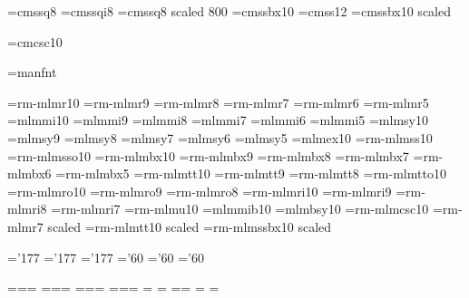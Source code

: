 \font\eightss=cmssq8
\font\eightssi=cmssqi8
\font\sixss=cmssq8 scaled 800
\font\tenssbx=cmssbx10
\font\twelvess=cmss12
\font\titlefont=cmssbx10 scaled

\font\tencsc=cmcsc10

\font\manfnt=manfnt %


\font\tenrm=rm-mlmr10 %
\font\preloaded=rm-mlmr9
\font\preloaded=rm-mlmr8
\font\sevenrm=rm-mlmr7
\font\preloaded=rm-mlmr6
\font\fiverm=rm-mlmr5
\font\teni=mlmmi10 %
\font\preloaded=mlmmi9
\font\preloaded=mlmmi8
\font\seveni=mlmmi7
\font\preloaded=mlmmi6
\font\fivei=mlmmi5
\font\tensy=mlmsy10 %
\font\preloaded=mlmsy9
\font\preloaded=mlmsy8
\font\sevensy=mlmsy7
\font\preloaded=mlmsy6
\font\fivesy=mlmsy5
\font\tenex=mlmex10 %
\font\preloaded=rm-mlmss10 %
\font\preloaded=rm-mlmsso10 %
\font\tenbf=rm-mlmbx10 %
\font\preloaded=rm-mlmbx9
\font\preloaded=rm-mlmbx8
\font\sevenbf=rm-mlmbx7
\font\preloaded=rm-mlmbx6
\font\fivebf=rm-mlmbx5
\font\tentt=rm-mlmtt10 %
\font\preloaded=rm-mlmtt9
\font\preloaded=rm-mlmtt8
\font\preloaded=rm-mlmtto10 %
\font\tensl=rm-mlmro10 %
\font\preloaded=rm-mlmro9
\font\preloaded=rm-mlmro8
\font\tenit=rm-mlmri10 %
\font\preloaded=rm-mlmri9
\font\preloaded=rm-mlmri8
\font\preloaded=rm-mlmri7
\font\preloaded=rm-mlmu10 %
\font\preloaded=mlmmib10 %
\font\preloaded=mlmbsy10 %
\font\preloaded=rm-mlmcsc10 %
\font\preloaded=rm-mlmr7 scaled  %
\font\preloaded=rm-mlmtt10 scaled 
\font\preloaded=rm-mlmssbx10 scaled 

\let\preloaded=\undefined %

\skewchar\teni='177 \skewchar\seveni='177 \skewchar\fivei='177
\skewchar\tensy='60 \skewchar\sevensy='60 \skewchar\fivesy='60

=\tenrm {}=\sevenrm {}=\fiverm
\def\rm{\fam\z@\tenrm}
=\teni {}=\seveni {}=\fivei
\def\mit{\fam\@ne} \def\oldstyle{\fam\@ne\teni}
=\tensy {}=\sevensy {}=\fivesy
\def\cal{\fam\tw@}
=\tenex {}=\tenex {}=\tenex
\newfam\itfam \def\it{\fam\itfam\tenit} %
\textfont\itfam=\tenit
\newfam\slfam \def\sl{\fam\slfam\tensl} %
\textfont\slfam=\tensl
\newfam\bffam \def\bf{\fam\bffam\tenbf} %
\textfont\bffam=\tenbf \scriptfont\bffam=\sevenbf
\scriptscriptfont\bffam=\fivebf
\newfam\ttfam \def\tt{\fam\ttfam\tentt} %
\textfont\ttfam=\tentt



